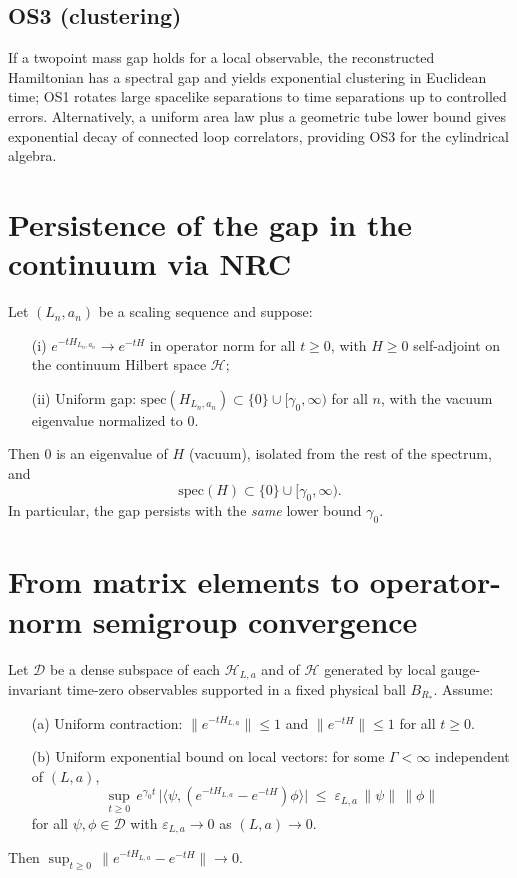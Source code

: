 \documentclass[11pt]{article}
\begin{document}
\subsection*{OS3 (clustering)}
If a two\-point mass gap holds for a local observable, the reconstructed Hamiltonian has a spectral gap and yields exponential clustering in Euclidean time; OS1 rotates large spacelike separations to time separations up to controlled errors. Alternatively, a uniform area law plus a geometric tube lower bound gives exponential decay of connected loop correlators, providing OS3 for the cylindrical algebra.

\section{Persistence of the gap in the continuum via NRC}

\begin{theorem}\label{persist}
Let $(L_n,a_n)$ be a scaling sequence and suppose:
\begin{itemize}
\item[(i)] $e^{-t H_{L_n,a_n}} \to e^{-tH}$ in operator norm for all $t\ge 0$, with $H\ge 0$ self-adjoint on the continuum Hilbert space $\mathcal{H}$;
\item[(ii)] Uniform gap: $\mathrm{spec}(H_{L_n,a_n})\subset \{0\}\cup[\gamma_0,\infty)$ for all $n$, with the vacuum eigenvalue normalized to $0$.
\end{itemize}
Then $0$ is an eigenvalue of $H$ (vacuum), isolated from the rest of the spectrum, and
\[
\mathrm{spec}(H)\subset \{0\}\cup[\gamma_0,\infty).
\]
In particular, the gap persists with the \emph{same} lower bound $\gamma_0$.
\end{theorem}

\section{From matrix elements to operator-norm semigroup convergence}

\begin{proposition}\label{upgrade}
Let $\mathcal{D}$ be a dense subspace of each $\mathcal{H}_{L,a}$ and of $\mathcal{H}$ generated by local gauge-invariant time-zero observables supported in a fixed physical ball $B_{R_*}$. Assume:
\begin{itemize}
\item[(a)] Uniform contraction: $\|e^{-tH_{L,a}}\|\le 1$ and $\|e^{-tH}\|\le 1$ for all $t\ge 0$.
\item[(b)] Uniform exponential bound on local vectors: for some $\Gamma<\infty$ independent of $(L,a)$,
\[
\sup_{t\ge 0}\, e^{\gamma_0 t}\,\bigl|\langle \psi, (e^{-tH_{L,a}}-e^{-tH})\phi\rangle\bigr| \;\le\; \varepsilon_{L,a}\,\|\psi\|\,\|\phi\|
\]
for all $\psi,\phi\in\mathcal{D}$ with $\varepsilon_{L,a}\to 0$ as $(L,a)\to 0$.
\end{itemize}
Then $\sup_{t\ge 0}\, \|e^{-tH_{L,a}}-e^{-tH}\| \to 0$.
\end{proposition}
\end{document}
